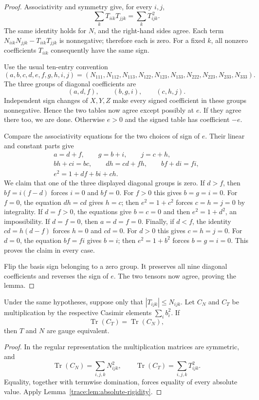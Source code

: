 \begin{proof}
Associativity and symmetry give, for every $i,j$,
\[
\sum_k T_{iik}T_{jjk}=\sum_k T_{ijk}^{\,2}.
\]
The same identity holds for $N$, and the right-hand sides agree. Each term
$N_{iik}N_{jjk}-T_{iik}T_{jjk}$ is nonnegative; therefore each is zero. For a fixed $k$, all nonzero coefficients $T_{iik}$ consequently have the same sign.

Use the usual ten-entry convention
\[
(a,b,c,d,e,f,g,h,i,j)
=(N_{111},N_{112},N_{113},N_{122},N_{123},
N_{133},N_{222},N_{223},N_{233},N_{333}).
\]
The three groups of diagonal coefficients are
\[
(a,d,f),\qquad(b,g,i),\qquad(c,h,j).
\]
Independent sign changes of $X,Y,Z$ make every signed coefficient in these groups nonnegative. Hence the two tables now agree except possibly at $e$. If they agree there too, we are done. Otherwise $e>0$ and the signed table has coefficient $-e$.

Compare the associativity equations for the two choices of sign of $e$. Their linear and constant parts give
\begin{gather*}
a=d+f,\qquad g=b+i,\qquad j=c+h,\\
bh+ci=bc,\qquad dh=cd+fh,\qquad bf+di=fi,\\
e^2=1+df+bi+ch.
\end{gather*}
We claim that one of the three displayed diagonal groups is zero.
If $d>f$, then $bf=i(f-d)$ forces $i=0$ and $bf=0$.
For $f>0$ this gives $b=g=i=0$.
For $f=0$, the equation $dh=cd$ gives $h=c$; then $e^2=1+c^2$ forces $c=h=j=0$ by integrality.
If $d=f>0$, the equations give $b=c=0$ and then $e^2=1+d^2$, an impossibility.
If $d=f=0$, then $a=d=f=0$.
Finally, if $d<f$, the identity $cd=h(d-f)$ forces $h=0$ and $cd=0$.
For $d>0$ this gives $c=h=j=0$.
For $d=0$, the equation $bf=fi$ gives $b=i$; then $e^2=1+b^2$ forces $b=g=i=0$.
This proves the claim in every case.

Flip the basis sign belonging to a zero group. It preserves all nine diagonal coefficients and reverses the sign of $e$. The two tensors now agree, proving the lemma.
\end{proof}

\begin{corollary}\label{trace:cor:trace-rigidity}
Under the same hypotheses, suppose only that $|T_{ijk}|\le N_{ijk}$. Let $C_N$ and $C_T$ be multiplication by the respective Casimir elements $\sum_i b_i^2$. If
\[
\operatorname{Tr}(C_T)=\operatorname{Tr}(C_N),
\]
then $T$ and $N$ are gauge equivalent.
\end{corollary}
\begin{proof}
In the regular representation the multiplication matrices are symmetric, and
\[
\operatorname{Tr}(C_N)=\sum_{i,j,k}N_{ijk}^2,
\qquad
\operatorname{Tr}(C_T)=\sum_{i,j,k}T_{ijk}^2.
\]
Equality, together with termwise domination, forces equality of every absolute value. Apply Lemma~\ref{trace:lem:absolute-rigidity}.
\end{proof}


